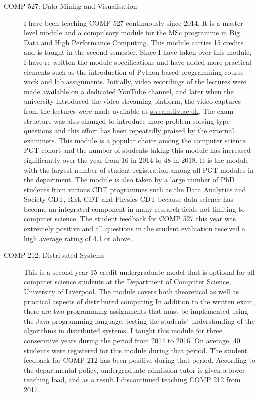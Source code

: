 \documentclass[a4paper,11pt]{article}
\begin{document}
\begin{description}
\item[COMP 527: Data Mining and Visualisation]
I have been teaching COMP 527 continuously since 2014. It is a master-level module and a compulsory module for the MSc programme in Big Data and High Performance Computing. This module carries 15 credits and is taught in the second semester.
Since I have taken over this module, I have re-written the module specifications and have added more practical elements such as the introduction of Python-based programming course work and lab assignments. 
Initially, video recordings of the lectures were made available on a dedicated YouTube channel, and later when the university introduced the video streaming platform, the video captures from the lectures were made available at \url{stream.liv.ac.uk}. 
The exam structure was also changed to introduce more problem solving-type questions and this effort has been repeatedly praised by the external examiners.
This module is a popular choice among the computer science PGT cohort and the number of students taking this module has increased significantly over the year from 16 in 2014 to 48 in 2018. It is the module with the largest number of student registration among all PGT modules in the department.
The module is also taken by a large number of PhD students from various CDT programmes such as the Data Analytics and Society CDT,
Risk CDT and Physics CDT because data science has become an integrated component in many research fields not limiting to computer science.
The student feedback for COMP 527 this year was extremely positive and all questions in the student evaluation received a high average rating of 4.1 or above.

\item[COMP 212: Distributed Systems]
This is a second year 15 credit undergraduate model that is optional for all computer science students at the Department of Computer Science, University of Liverpool. The module covers both theoretical as well as practical aspects of distributed computing 
In addition to the written exam, there are two programming assignments that must be implemented using the Java programming language, testing the students' understanding of the algorithms in distributed systems.
I taught this module for three consecutive years during the period from 2014 to 2016.
On average, 40 students were registered for this module during that period. The student feedback for COMP 212 has been positive during that period. 
According to the departmental policy, undergraduate admission tutor is given a lower teaching load, and as a result I discontinued teaching COMP 212 from 2017.


\end{description}
\end{document}
